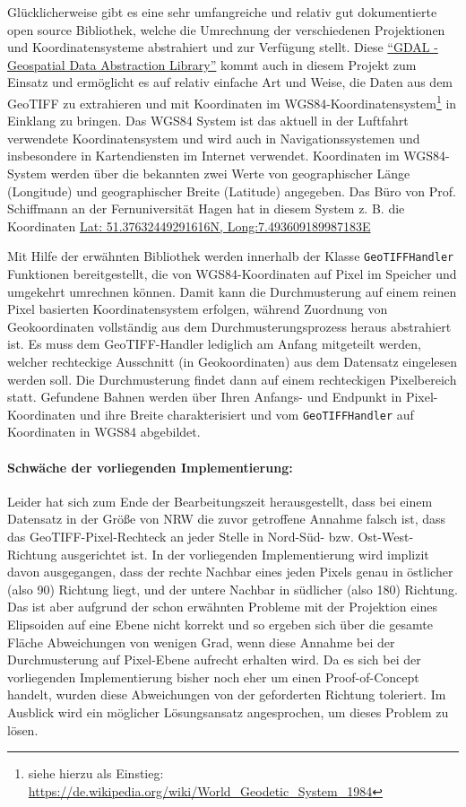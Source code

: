 \documentclass[10pt,a4paper]{report}
\begin{document}
Glücklicherweise gibt es eine sehr umfangreiche und relativ gut dokumentierte open source Bibliothek, welche die Umrechnung der verschiedenen Projektionen und Koordinatensysteme abstrahiert und zur Verfügung stellt. Diese \href{http://www.gdal.org/}{"`GDAL - Geospatial Data Abstraction Library"'} kommt auch in diesem Projekt zum Einsatz und ermöglicht es auf relativ einfache Art und Weise, die Daten aus dem GeoTIFF zu extrahieren und mit Koordinaten im WGS84-Koordinatensystem\footnote{siehe hierzu als Einstieg: \href{https://de.wikipedia.org/wiki/World_Geodetic_System_1984}{https://de.wikipedia.org/wiki/World\_Geodetic\_System\_1984}} in Einklang zu bringen. Das WGS84 System ist das aktuell in der Luftfahrt verwendete Koordinatensystem und wird auch in Navigationssystemen und insbesondere in Kartendiensten im Internet verwendet. Koordinaten im WGS84-System werden über die bekannten zwei Werte von geographischer Länge (Longitude) und geographischer Breite (Latitude) angegeben. Das Büro von Prof. Schiffmann an der Fernuniversität Hagen hat in diesem System z. B. die Koordinaten \href{http://bl.ocks.org/d/94faa16e1c8cb9d9226902f9fb0cc36c}{Lat: 51.37632449291616N, Long:7.493609189987183E}

Mit Hilfe der erwähnten Bibliothek werden innerhalb der Klasse \texttt{GeoTIFFHandler} Funktionen bereitgestellt, die von WGS84-Koordinaten auf Pixel im Speicher und umgekehrt umrechnen können. Damit kann die Durchmusterung auf einem reinen Pixel basierten Koordinatensystem erfolgen, während Zuordnung von Geokoordinaten vollständig aus dem Durchmusterungsprozess heraus abstrahiert ist. Es muss dem GeoTIFF-Handler lediglich am Anfang mitgeteilt werden, welcher rechteckige Ausschnitt (in Geokoordinaten) aus dem Datensatz eingelesen werden soll. Die Durchmusterung findet dann auf einem rechteckigen Pixelbereich statt. Gefundene Bahnen werden über Ihren Anfangs- und Endpunkt in Pixel-Koordinaten und ihre Breite charakterisiert und vom \texttt{GeoTIFFHandler} auf Koordinaten in WGS84 abgebildet.

\paragraph{Schwäche der vorliegenden Implementierung:} Leider hat sich zum Ende der Bearbeitungszeit herausgestellt, dass bei einem Datensatz in der Größe von NRW die zuvor getroffene Annahme falsch ist, dass das GeoTIFF-Pixel-Rechteck an jeder Stelle in Nord-Süd- bzw. Ost-West-Richtung ausgerichtet ist. In der vorliegenden Implementierung wird implizit davon ausgegangen, dass der rechte Nachbar eines jeden Pixels genau in östlicher (also 90\degree) Richtung liegt, und der untere Nachbar in südlicher (also 180\degree) Richtung. Das ist aber aufgrund der schon erwähnten Probleme mit der Projektion eines Elipsoiden auf eine Ebene nicht korrekt und so ergeben sich über die gesamte Fläche Abweichungen von wenigen Grad, wenn diese Annahme bei der Durchmusterung auf Pixel-Ebene aufrecht erhalten wird. Da es sich bei der vorliegenden Implementierung bisher noch eher um einen Proof-of-Concept handelt, wurden diese Abweichungen von der geforderten Richtung toleriert. Im Ausblick wird ein möglicher Lösungsansatz angesprochen, um dieses Problem zu lösen.
\end{document}

